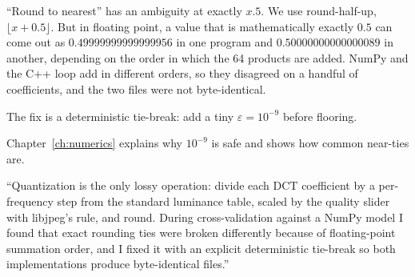 ``Round to nearest'' has an ambiguity at exactly $x.5$. We use round-half-up, $\lfloor x+0.5\rfloor$. But in floating point, a value that is mathematically exactly $0.5$ can come out as $0.49999999999999956$ in one program and $0.50000000000000089$ in another, depending on the order in which the 64 products are added. NumPy and the C++ loop add in different orders, so they disagreed on a handful of coefficients, and the two files were not byte-identical.

The fix is a deterministic tie-break: add a tiny $\varepsilon=10^{-9}$ before flooring.

Chapter~\ref{ch:numerics} explains why $10^{-9}$ is safe and shows how common near-ties are.

\begin{sound}
``Quantization is the only lossy operation: divide each DCT coefficient by a per-frequency step from the standard luminance table, scaled by the quality slider with libjpeg's rule, and round. During cross-validation against a NumPy model I found that exact rounding ties were broken differently because of floating-point summation order, and I fixed it with an explicit deterministic tie-break so both implementations produce byte-identical files.''
\end{sound}
